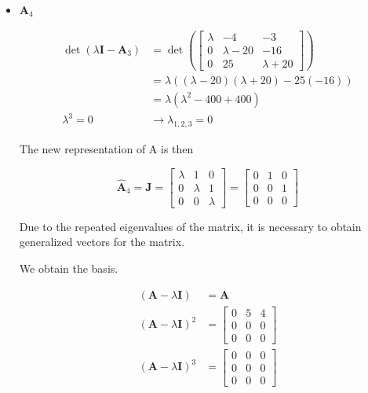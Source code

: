 \begin{itemize}
 \item $\mathbf{A}_4$

 \begin{align*}
\det(\lambda \mathbf{I} - \mathbf{A}_3) &= \det \left( \begin{bmatrix}
                                   \lambda & -4 & -3\\
                                   0 & \lambda -20 & -16\\
                                   0 & 25 & \lambda +20
                                  \end{bmatrix}
 \right)\\
 &= \lambda((\lambda -20)(\lambda +20)-25(-16))\\
 &= \lambda (\lambda^2 -400+400)\\
 \lambda^3 = 0 &\rightarrow \lambda_{1,2,3} =0
 \end{align*}

 The new representation of A is then

  \begin{equation*}
  \hat{\mathbf{A}}_4 = \mathbf{J}  =  \begin{bmatrix}
                                       \lambda & 1 & 0\\
                                       0 & \lambda & 1\\
                                       0 & 0 & \lambda
                                      \end{bmatrix}
 = \begin{bmatrix}
                       0 & 1 & 0\\ 0&0&1\\0&0&0
                      \end{bmatrix}
 \end{equation*}

 Due to the repeated eigenvalues of the matrix, it is necessary
 to obtain generalized vectors for the matrix.

We obtain the basis.

\begin{align*}
 (\mathbf{A}-\lambda\mathbf{I}) &= \mathbf{A}\\
 (\mathbf{A}-\lambda\mathbf{I})^2 &= \begin{bmatrix}
                                      0 & 5 & 4\\
                                      0 & 0 & 0\\
                                      0 & 0 & 0
                                     \end{bmatrix}
\\
 (\mathbf{A}-\lambda\mathbf{I})^3 &= \begin{bmatrix}
                                      0 & 0 & 0\\
                                      0 & 0 & 0\\
                                      0 & 0 & 0
                                     \end{bmatrix}
\end{align*}


\end{itemize}
